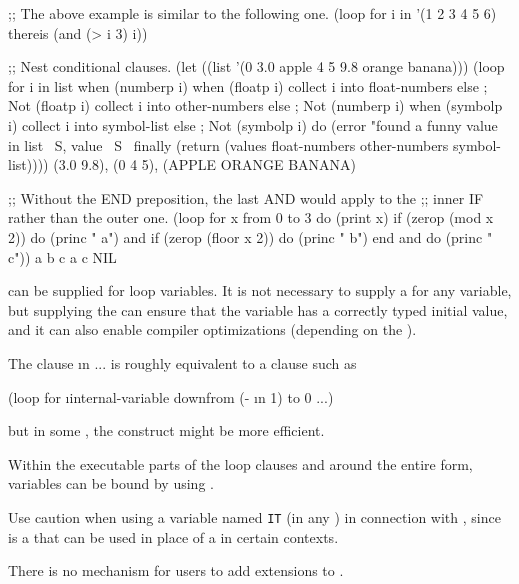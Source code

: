 ;; The above example is similar to the following one.
 (loop for i in '(1 2 3 4 5 6)
       thereis (and (> i 3) i))

\medbreak
;; Nest conditional clauses.
 (let ((list '(0 3.0 apple 4 5 9.8 orange banana)))
   (loop for i in list
         when (numberp i)
           when (floatp i)
             collect i into float-numbers
           else                                  ; Not (floatp i)
             collect i into other-numbers
         else                                    ; Not (numberp i)
           when (symbolp i) 
             collect i into symbol-list
           else                                  ; Not (symbolp i)
             do (error "found a funny value in list ~S, value ~S~%
         finally (return (values float-numbers other-numbers symbol-list))))
\EV (3.0 9.8), (0 4 5), (APPLE ORANGE BANANA)

;; Without the END preposition, the last AND would apply to the
;; inner IF rather than the outer one.
 (loop for x from 0 to 3 
       do (print x)
       if (zerop (mod x 2))
         do (princ " a")
          and if (zerop (floor x 2))
                do (princ " b")
                end
          and do (princ " c"))
  a b c
  a c
\EV NIL
\endcode
 
\endsubsubsection%

\endsubSection%


 can be supplied for loop variables.  
It is not necessary to supply a  for any variable,
but supplying the  
can ensure that the variable has a correctly typed initial value,
and it can also enable compiler optimizations 
(depending on the ).
 
The clause  \i{n} ... is roughly equivalent to a clause such as 
  
\code
 (loop for \i{internal-variable} downfrom (- \i{n} 1) to 0 ...)
\endcode
                                                            
but in some ,
the  construct might be more efficient.

Within the executable parts of the loop clauses and around the entire
 form, variables can be bound by using .

Use caution when using a variable named {\tt IT} (in any )
in connection with , since  is a  
that can be used in place of a  in certain contexts.

There is
no
mechanism for users to add
extensions to .

\endsubSection%
